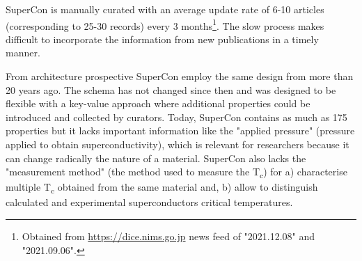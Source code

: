 \documentclass{article}
\begin{document}


SuperCon is manually curated with an average update rate of 6-10 articles (corresponding to 25-30 records) every 3 months\footnote{Obtained from \url{https://dice.nims.go.jp} news feed of "2021.12.08" and "2021.09.06".}. 
The slow process makes difficult to incorporate the information from new publications in a timely manner.

From architecture prospective SuperCon employ the same design from more than 20 years ago. The schema has not changed since then and was designed to be flexible with a key-value approach where additional properties could be introduced and collected by curators.
Today, SuperCon contains as much as 175 properties but it lacks important information like the "applied pressure" (pressure applied to obtain superconductivity), which is relevant for researchers because it can change radically the nature of a material. 
SuperCon also lacks the "measurement method" (the method used to measure the T\textsubscript{c}) for a) characterise multiple T\textsubscript{c} obtained from the same material and, b) allow to distinguish calculated and experimental superconductors critical temperatures. 
\end{document}
